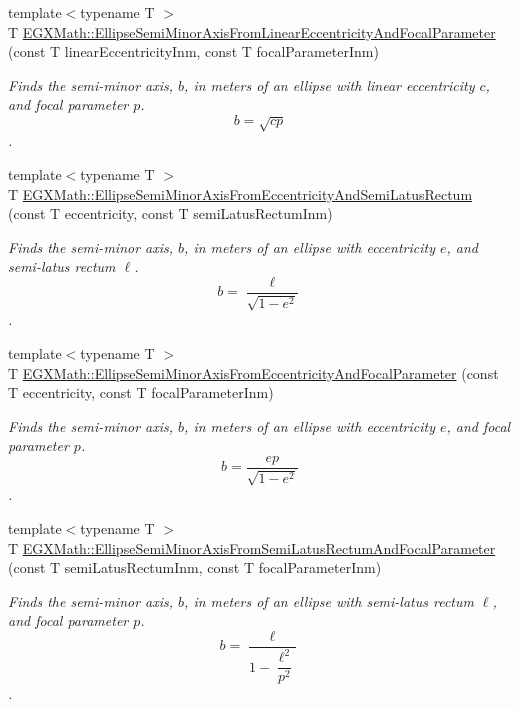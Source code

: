 \begin{DoxyCompactItemize}
{\footnotesize template$<$typename T $>$ }\\T \mbox{\hyperlink{group___e_g_x_math-_geometry-2_d-_ellipse-_semi_minor_axis_ga03cbc96729f84c9691bf1c5bfcc6b083}{E\+G\+X\+Math\+::\+Ellipse\+Semi\+Minor\+Axis\+From\+Linear\+Eccentricity\+And\+Focal\+Parameter}} (const T linear\+Eccentricity\+Inm, const T focal\+Parameter\+Inm)
\begin{DoxyCompactList}\small\item\em Finds the semi-\/minor axis, $b$, in meters of an ellipse with linear eccentricity $c$, and focal parameter $p$. \[ b=\sqrt{c p} \]. \end{DoxyCompactList}\item 
{\footnotesize template$<$typename T $>$ }\\T \mbox{\hyperlink{group___e_g_x_math-_geometry-2_d-_ellipse-_semi_minor_axis_ga1194f5481c66c492147a27b9e167df4f}{E\+G\+X\+Math\+::\+Ellipse\+Semi\+Minor\+Axis\+From\+Eccentricity\+And\+Semi\+Latus\+Rectum}} (const T eccentricity, const T semi\+Latus\+Rectum\+Inm)
\begin{DoxyCompactList}\small\item\em Finds the semi-\/minor axis, $b$, in meters of an ellipse with eccentricity $e$, and semi-\/latus rectum $\ell$. \[ b=\dfrac{\ell}{\sqrt{1 - e^2}} \]. \end{DoxyCompactList}\item 
{\footnotesize template$<$typename T $>$ }\\T \mbox{\hyperlink{group___e_g_x_math-_geometry-2_d-_ellipse-_semi_minor_axis_ga7bfc286b245acfcfd6c6bce85d25cdbb}{E\+G\+X\+Math\+::\+Ellipse\+Semi\+Minor\+Axis\+From\+Eccentricity\+And\+Focal\+Parameter}} (const T eccentricity, const T focal\+Parameter\+Inm)
\begin{DoxyCompactList}\small\item\em Finds the semi-\/minor axis, $b$, in meters of an ellipse with eccentricity $e$, and focal parameter $p$. \[ b=\dfrac{ep}{\sqrt{1 - e^2}} \]. \end{DoxyCompactList}\item 
{\footnotesize template$<$typename T $>$ }\\T \mbox{\hyperlink{group___e_g_x_math-_geometry-2_d-_ellipse-_semi_minor_axis_gafe27ed64ba521ec3cf8557520cbc6a14}{E\+G\+X\+Math\+::\+Ellipse\+Semi\+Minor\+Axis\+From\+Semi\+Latus\+Rectum\+And\+Focal\+Parameter}} (const T semi\+Latus\+Rectum\+Inm, const T focal\+Parameter\+Inm)
\begin{DoxyCompactList}\small\item\em Finds the semi-\/minor axis, $b$, in meters of an ellipse with semi-\/latus rectum $\ell$, and focal parameter $p$. \[ b=\dfrac{\ell}{1-\dfrac{\ell^2}{p^2}} \]. \end{DoxyCompactList}\end{DoxyCompactItemize}


